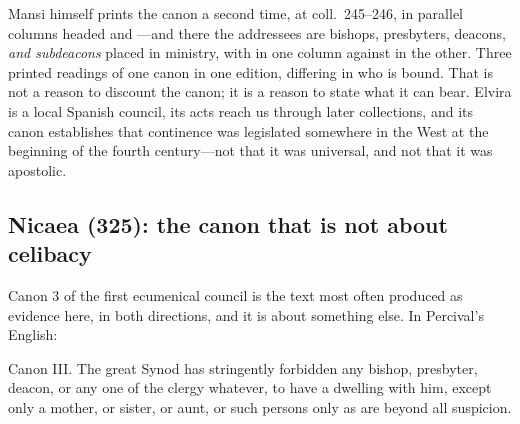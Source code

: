 Mansi himself prints the canon a second time, at coll.~245--246, in parallel columns headed  and ---and there the addressees are bishops, presbyters, deacons, \emph{and subdeacons} placed in ministry, with  in one column against  in the other. Three printed readings of one canon in one edition, differing in who is bound. That is not a reason to discount the canon; it is a reason to state what it can bear. Elvira is a local Spanish council, its acts reach us through later collections, and its canon establishes that continence was legislated somewhere in the West at the beginning of the fourth century---not that it was universal, and not that it was apostolic.

\subsection{Nicaea (325): the canon that is not about celibacy}

Canon 3 of the first ecumenical council is the text most often produced as evidence here, in both directions, and it is about something else. In Percival's English:

\begin{studyframe}
Canon III. The great Synod has stringently forbidden any bishop, presbyter, deacon, or any one of the clergy whatever, to have a  dwelling with him, except only a mother, or sister, or aunt, or such persons only as are beyond all suspicion.
\end{studyframe}

